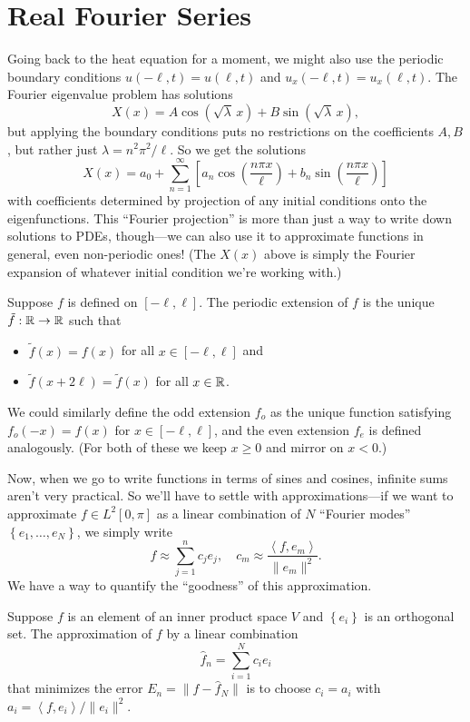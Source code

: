 \documentclass[../m180main.tex]{subfiles}
\begin{document}
\section{Real Fourier Series}
Going back to the heat equation for a moment, we might also use the periodic boundary conditions $u(-\ell, t) = u(\ell, t)$ and $u_x(-\ell, t) = u_x(\ell, t)$.
The Fourier eigenvalue problem has solutions 
\[ X(x) = A \cos (\sqrt{\lambda} \,x) + B \sin (\sqrt{\lambda} \,x), \]
but applying the boundary conditions puts no restrictions on the coefficients $A,B$, but rather just $\lambda = n^2 \pi^2 / \ell$.
So we get the solutions
\[ X(x) = a_0 + \sum_{n=1}^{\infty} \left[ a_n \cos \left( \frac{n\pi x}{\ell} \right) + b_n \sin \left( \frac{n\pi x}{\ell} \right) \right] \]
with coefficients determined by projection of any initial conditions onto the eigenfunctions.
This ``Fourier projection'' is more than just a way to write down solutions to PDEs, though---we can also use it to approximate functions in general, even non-periodic ones!
(The $X(x)$ above is simply the Fourier expansion of whatever initial condition we're working with.)

\begin{definition}
    Suppose $f$ is defined on $[-\ell, \ell]$.
    The periodic extension of $f$ is the unique $\tilde f : \mathbb{R} \to \mathbb{R}$ such that
    \begin{itemize}[topsep=0pt]
        \item $\tilde f(x) = f(x)$ for all $x \in [-\ell, \ell]$ and
        \item $\tilde f(x + 2\ell) = \tilde f(x)$ for all $x \in \mathbb{R}$.
    \end{itemize}
\end{definition}
We could similarly define the odd extension $f_o$ as the unique function satisfying $f_o(-x) = f(x)$ for $x \in [-\ell, \ell]$, and the even extension $f_e$ is defined analogously.
(For both of these we keep $x \geq 0$ and mirror on $x < 0$.)

Now, when we go to write functions in terms of sines and cosines, infinite sums aren't very practical.
So we'll have to settle with approximations---if we want to approximate $f \in L^2[0,\pi]$ as a linear combination of $N$ ``Fourier modes'' $\left\{ e_1, \ldots, e_N \right\}$, we simply write
\[ f \approx \sum_{j=1}^{n} c_j e_j, \quad c_m \approx \frac{\left< f, e_m \right>}{\| e_m\|^2}. \]
We have a way to quantify the ``goodness'' of this approximation.

\begin{theorem}[]
    Suppose $f$ is an element of an inner product space $V$ and $\left\{ e_i \right\}$ is an orthogonal set.
    The approximation of $f$ by a linear combination
    \[ \hat f_n = \sum_{i=1}^{N} c_i e_i \]
    that minimizes the error $E_n = \| f - \hat f_N \|$ is to choose $c_i = a_i$ with $a_i = \left< f, e_i \right> / \| e_i \|^2$.
\end{theorem}
\end{document}
